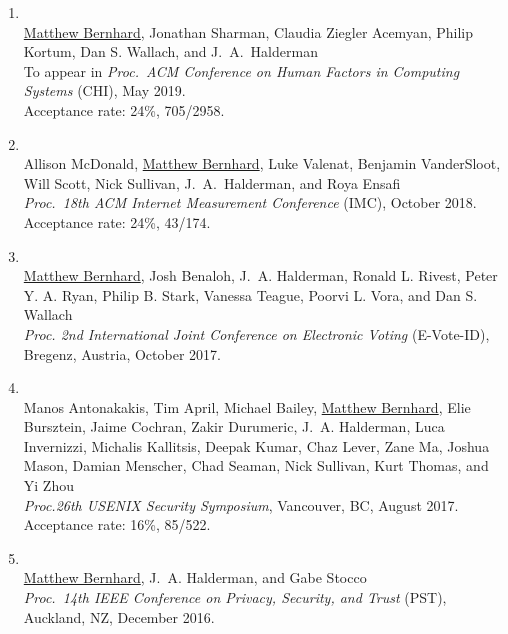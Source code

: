 \documentclass[11pt]{article}
\begin{document}
\begin{enumerate}[leftmargin=0.25in,labelsep=0.25em,resume]
\addtolength{\itemsep}{-0.25\baselineskip}

\item
{}\\
\uline{Matthew Bernhard}, Jonathan Sharman, Claudia Ziegler Acemyan, Philip Kortum, Dan S. Wallach, and J.~A.~Halderman\\
To appear in {\em Proc.\ ACM Conference on Human Factors in Computing Systems} (CHI), May 2019.\\
Acceptance rate: 24\%, 705/2958.

\item
{}\\
Allison McDonald, \uline{Matthew Bernhard}, Luke Valenat, Benjamin VanderSloot, Will Scott, Nick Sullivan, J.~A.~Halderman, and Roya Ensafi\\
{\em Proc.\ 18th ACM Internet Measurement Conference} (IMC), October 2018.\\
Acceptance rate: 24\%, 43/174.

\item
{}\\
\uline{Matthew Bernhard}, Josh Benaloh, J.~A. Halderman,  Ronald L. Rivest, Peter Y. A. Ryan, Philip B. Stark, Vanessa Teague, Poorvi L. Vora, and Dan S. Wallach\\
{\em Proc. 2nd International Joint Conference on Electronic Voting} (E-Vote-ID), Bregenz, Austria, October 2017.

\item
{}\\
Manos Antonakakis, Tim April, Michael Bailey, \uline{Matthew Bernhard}, Elie Bursztein, Jaime Cochran, Zakir Durumeric, J.~A. Halderman, Luca Invernizzi, Michalis Kallitsis, Deepak Kumar, Chaz Lever, Zane Ma, Joshua Mason, Damian Menscher, Chad Seaman, Nick Sullivan, Kurt Thomas, and Yi Zhou\\
{\em Proc.\@ 26th USENIX Security Symposium}, Vancouver, BC, August 2017.\\
Acceptance rate: 16\%, 85/522.

\item
{}\\
\uline{Matthew Bernhard}, J.~A. Halderman, and Gabe Stocco\\
{\em Proc.\ 14th IEEE Conference on Privacy, Security, and Trust} (PST), Auckland, NZ, December 2016.


\end{enumerate}
\end{document}

